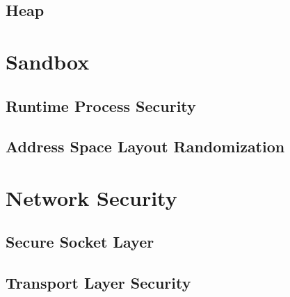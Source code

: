 \subsection{Heap}
\label{sec:Heap}

\section{Sandbox}
\label{sec:Sandbox}
\cite{sandbox[1]}
\cite{sandbox[2]}


\subsection{Runtime Process Security}
\label{sec:RuntimeProcessSecurity}

\subsection{Address Space Layout Randomization}
\label{sec:ASLR}

\section{Network Security}
\label{sec:NetworkSecurity}

\subsection{Secure Socket Layer}
\label{sec:SSL}

\subsection{Transport Layer Security}
\label{sec:TLS}

